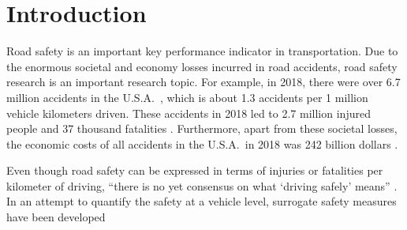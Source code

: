 \section{Introduction}
\label{sec:introduction}

Road safety is an important key performance indicator in transportation. 
Due to the enormous societal and economy losses incurred in road accidents, road safety research is an important research topic.
For example, in 2018, there were over 6.7 million accidents in the U.S.A.\ \autocite{nhtsa2020summary}, which is about 1.3 accidents per 1 million vehicle kilometers driven.
These accidents in 2018 led to 2.7 million injured people and 37 thousand fatalities \autocite{nhtsa2020summary}.
Furthermore, apart from these societal losses, the economic costs of all accidents in the U.S.A.\ in 2018 was 242 billion dollars \autocite{nhtsa2020summary}.

Even though road safety can be expressed in terms of injuries or fatalities per kilometer of driving, ``there is no yet consensus on what `driving safely' means'' \autocite{tejada2020safe}.
In an attempt to quantify the safety at a vehicle level, surrogate safety measures have been developed 









